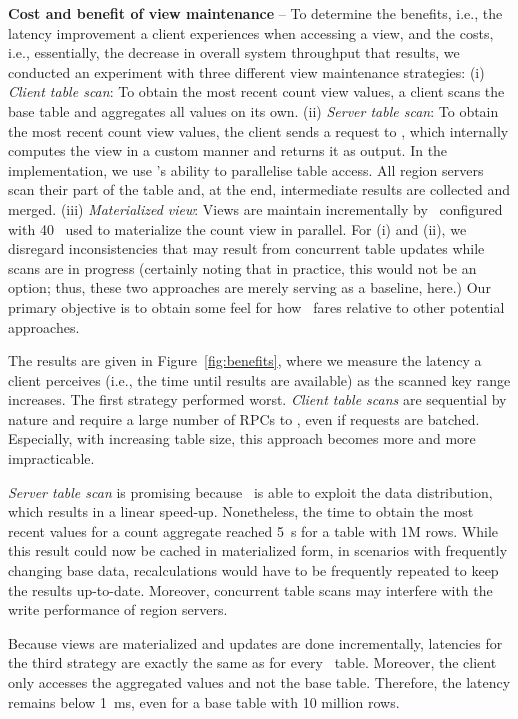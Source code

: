 \noindent
{\bf Cost and benefit of view maintenance} -- To determine the
benefits, i.e., the latency improvement a client experiences when
accessing a view, and the costs, i.e., essentially, the decrease in
overall system throughput that results, we conducted an experiment
with three different view maintenance strategies: (i) \textit{Client
  table scan}: To obtain the most recent count view values, a client
scans the base table and aggregates all values on its own. (ii)
\textit{Server table scan}: To obtain the most recent count view
values, the client sends a request to \HB, which internally computes
the view in a custom manner and returns it as output. In the
implementation, we use \HB's ability to parallelise table access.  All
region servers scan their part of the table and, at the end,
intermediate results are collected and merged.  (iii)
\textit{Materialized view}: Views are maintain incrementally by
\VMS\ configured with 40 \VMs\ used to materialize the count view in
parallel.  For (i) and (ii), we disregard inconsistencies that may
result from concurrent table updates while scans are in progress
(certainly noting that in practice, this would not be an option; thus,
these two approaches are merely serving as a baseline, here.) Our
primary objective is to obtain some feel for how \VMS\ fares relative
to other potential approaches.

The results are given in Figure~\ref{fig:benefits}, where we measure
the latency a client perceives (i.e., the time until results are
available) as the scanned key range increases.  The first strategy
performed worst. \textit{Client table scans} are sequential by nature
and require a large number of RPCs to \HB, even if requests are
batched. Especially, with increasing table size, this approach becomes
more and more impracticable.



\textit{Server table scan} is promising because \HB\ is able to
exploit the data distribution, which results in a linear speed-up.
Nonetheless, the time to obtain the most recent values for a count
aggregate reached 5~s for a table with 1M rows.  While this result
could now be cached in materialized form, in scenarios with frequently
changing base data, recalculations would have to be frequently
repeated to keep the results up-to-date. Moreover, concurrent table
scans may interfere with the write performance of region servers.

Because views are materialized and updates are done incrementally,
latencies for the third strategy are exactly the same as for every
\HB\ table. Moreover, the client only accesses the aggregated values
and not the base table. Therefore, the latency remains below 1~ms,
even for a base table with 10 million rows.

